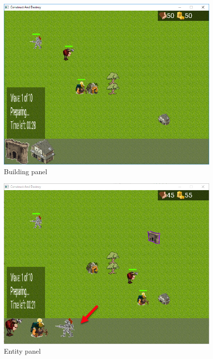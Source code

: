\begin{figure}[!htb]
    \centering
    \includegraphics[scale=0.8]{res/building-panel.png}
    \caption{Building panel}\label{fig:building-panel}
\end{figure}

\begin{figure}[!htb]
    \centering
    \includegraphics[scale=0.8]{res/entity-panel.png}
    \caption{Entity panel}\label{fig:entity-panel}
\end{figure}

